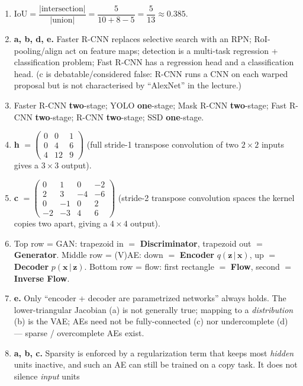 \documentclass[11pt,oneside]{article}
\newcommand{\given}{\,\vert\,}
\begin{document}
\begin{enumerate}[label=\textbf{Q\arabic*.}, leftmargin=3em, itemsep=4pt]
  \item $\mathrm{IoU}=\dfrac{|\text{intersection}|}{|\text{union}|}=\dfrac{5}{10+8-5}=\dfrac{5}{13}\approx\mathbf{0.385}$.
  \item \textbf{a, b, d, e.} Faster R-CNN replaces selective search with an RPN; RoI-pooling/align act on
        feature maps; detection is a multi-task regression + classification problem; Fast R-CNN has a
        regression head and a classification head. (c is debatable/considered false: R-CNN runs a CNN on
        each warped proposal but is not characterised by ``AlexNet'' in the lecture.)
  \item Faster R-CNN \textbf{two}-stage; YOLO \textbf{one}-stage; Mask R-CNN \textbf{two}-stage;
        Fast R-CNN \textbf{two}-stage; R-CNN \textbf{two}-stage; SSD \textbf{one}-stage.
  \item \textbf{h} $=\begin{pmatrix}0&0&1\\0&4&6\\4&12&9\end{pmatrix}$ (full stride-1 transpose convolution
        of two $2\times2$ inputs gives a $3\times3$ output).
  \item \textbf{c} $=\begin{pmatrix}0&1&0&-2\\2&3&-4&-6\\0&-1&0&2\\-2&-3&4&6\end{pmatrix}$ (stride-2
        transpose convolution spaces the kernel copies two apart, giving a $4\times4$ output).
  \item Top row = GAN: trapezoid in $=$ \textbf{Discriminator}, trapezoid out $=$ \textbf{Generator}.
        Middle row = (V)AE: down $=$ \textbf{Encoder} $q(\mathbf{z}\given\mathbf{x})$, up $=$
        \textbf{Decoder} $p(\mathbf{x}\given\mathbf{z})$. Bottom row = flow: first rectangle $=$
        \textbf{Flow}, second $=$ \textbf{Inverse Flow}.
  \item \textbf{e.} Only ``encoder + decoder are parametrized networks'' always holds. The lower-triangular
        Jacobian (a) is not generally true; mapping to a \emph{distribution} (b) is the VAE; AEs need not be
        fully-connected (c) nor undercomplete (d) --- sparse / overcomplete AEs exist.
  \item \textbf{a, b, c.} Sparsity is enforced by a regularization term that keeps most \emph{hidden} units
        inactive, and such an AE can still be trained on a copy task. It does not silence \emph{input} units

\end{enumerate}
\end{document}
